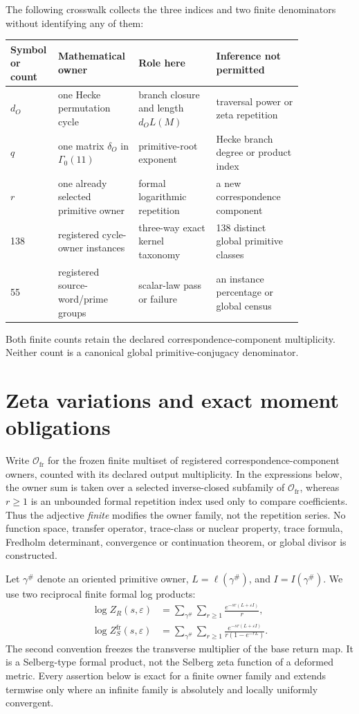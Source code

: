 \documentclass[11pt]{article}
\theoremstyle{definition}
\theoremstyle{remark}
\newcommand{\G}{\Gamma_0(11)}
\newcommand{\e}{\varepsilon}
\begin{document}
The following crosswalk collects the three indices and two finite denominators without identifying any of them:
\begin{center}
\small
\begin{tabular}{p{0.10\linewidth}p{0.20\linewidth}p{0.25\linewidth}p{0.29\linewidth}}
\toprule
Symbol or count & Mathematical owner & Role here & Inference not permitted\\
\midrule
$d_O$ & one Hecke permutation cycle & branch closure and length $d_OL(M)$ & traversal power or zeta repetition\\
$q$ & one matrix $\delta_O$ in $\G$ & primitive-root exponent & Hecke branch degree or product index\\
$r$ & one already selected primitive owner & formal logarithmic repetition & a new correspondence component\\
138 & registered cycle-owner instances & three-way exact kernel taxonomy & 138 distinct global primitive classes\\
55 & registered source-word/prime groups & scalar-law pass or failure & an instance percentage or global census\\
\bottomrule
\end{tabular}
\end{center}
Both finite counts retain the declared correspondence-component multiplicity. Neither count is a canonical global primitive-conjugacy denominator.

\section{Zeta variations and exact moment obligations}

Write $\mathcal O_{\mathrm{fr}}$ for the frozen finite multiset of registered correspondence-component owners, counted with its declared output multiplicity. In the expressions below, the owner sum is taken over a selected inverse-closed subfamily of $\mathcal O_{\mathrm{fr}}$, whereas $r\geq1$ is an unbounded formal repetition index used only to compare coefficients. Thus the adjective \emph{finite} modifies the owner family, not the repetition series. No function space, transfer operator, trace-class or nuclear property, trace formula, Fredholm determinant, convergence or continuation theorem, or global divisor is constructed.

Let $\gamma^\#$ denote an oriented primitive owner, $L=\ell(\gamma^\#)$, and $I=I(\gamma^\#)$. We use two reciprocal finite formal log products:
\begin{align}
\log Z_R(s,\e)
&=\sum_{\gamma^\#}\sum_{r\geq1}\frac{e^{-sr(L+\e I)}}r,\label{eq:ruelle}\\
\log Z_S^{\mathrm{fr}}(s,\e)
&=\sum_{\gamma^\#}\sum_{r\geq1}
\frac{e^{-sr(L+\e I)}}{r(1-e^{-rL})}.\label{eq:selberg}
\end{align}
The second convention freezes the transverse multiplier of the base return map. It is a Selberg-type formal product, not the Selberg zeta function of a deformed metric. Every assertion below is exact for a finite owner family and extends termwise only where an infinite family is absolutely and locally uniformly convergent.
\end{document}
